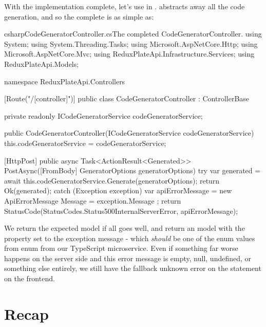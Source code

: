 \documentclass[paper=6in:9in,pagesize=pdftex,headinclude=on,footinclude=on,12pt,twoside]{scrbook}
\begin{document}
With the implementation complete, let's use  in .  abstracts away all the code generation, and so the complete  is as simple as:

\begin{code}{csharp}{CodeGeneratorController.cs}{The completed CodeGeneratorController.}
using System;
using System.Threading.Tasks;
using Microsoft.AspNetCore.Http;
using Microsoft.AspNetCore.Mvc;
using ReduxPlateApi.Infrastructure.Services;
using ReduxPlateApi.Models;

namespace ReduxPlateApi.Controllers
{
    [Route("/[controller]")]
    public class CodeGeneratorController : ControllerBase
    {
        private readonly ICodeGeneratorService codeGeneratorService;

        public CodeGeneratorController(ICodeGeneratorService codeGeneratorService)
        {
            this.codeGeneratorService = codeGeneratorService;
        }

        [HttpPost]
        public async Task<ActionResult<Generated>> PostAsync([FromBody] GeneratorOptions generatorOptions)
        {
            try
            {
                var generated = await this.codeGeneratorService.Generate(generatorOptions);
                return Ok(generated);
            } catch (Exception exception)
            {
                var apiErrorMessage = new ApiErrorMessage
                {
                    Message = exception.Message
                };
                return StatusCode(StatusCodes.Status500InternalServerError, apiErrorMessage);
            }
        }
    }
}  
\end{code}

We return the expected  model if all goes well, and return an  model with the  property set to the exception message - which \textit{should} be one of the enum values from  enum from our TypeScript microservice. Even if something far worse happens on the server side and this error message is empty, null, undefined, or something else entirely, we still have the fallback unknown error on the  statement on the frontend.

\section{Recap}
\end{document}
